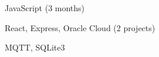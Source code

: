 
\begin{cvskills}
        {JavaScript (3 months)} %

        {React, Express, Oracle Cloud (2 projects)} %
        
        {MQTT, SQLite3}
\end{cvskills}
